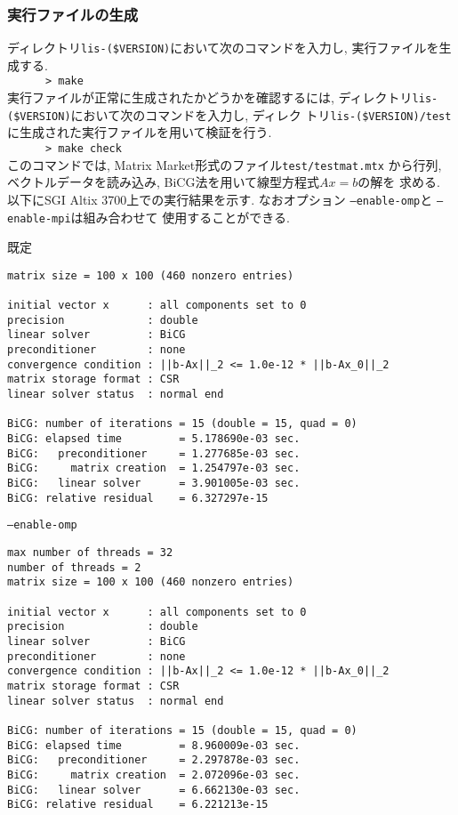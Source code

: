 \documentclass[a4paper]{jarticle}
\begin{document}
\subsubsection{実行ファイルの生成}
ディレクトリ{\tt lis-(\$VERSION)}において次のコマンドを入力し, 実行ファイルを生成する.\\
 \verb+      > make +\\
実行ファイルが正常に生成されたかどうかを確認するには, 
ディレクトリ{\tt lis-(\$VERSION)}において次のコマンドを入力し, ディレク
 トリ{\tt lis-(\$VERSION)/test}に生成された実行ファイルを用いて検証を行う. \\
 \verb+      > make check+\\
このコマンドでは, Matrix Market形式のファイル{\tt test/testmat.mtx}
から行列, ベクトルデータを読み込み, BiCG法を用いて線型方程式$Ax=b$の解を
求める. 以下にSGI Altix 3700上での実行結果を示す. 
なおオプション {\tt --enable-omp}と {\tt --enable-mpi}は組み合わせて
使用することができる. 
\begin{itembox}[l]{既定}
\begin{minipage}{10cm}
\begin{verbatim}
matrix size = 100 x 100 (460 nonzero entries)

initial vector x      : all components set to 0
precision             : double
linear solver         : BiCG
preconditioner        : none
convergence condition : ||b-Ax||_2 <= 1.0e-12 * ||b-Ax_0||_2
matrix storage format : CSR
linear solver status  : normal end

BiCG: number of iterations = 15 (double = 15, quad = 0)
BiCG: elapsed time         = 5.178690e-03 sec.
BiCG:   preconditioner     = 1.277685e-03 sec.
BiCG:     matrix creation  = 1.254797e-03 sec.
BiCG:   linear solver      = 3.901005e-03 sec.
BiCG: relative residual    = 6.327297e-15
\end{verbatim}
\end{minipage}
\end{itembox}
\begin{itembox}[l]{ {\tt --enable-omp}}
 \begin{minipage}{10cm}
 \begin{verbatim}
max number of threads = 32
number of threads = 2
matrix size = 100 x 100 (460 nonzero entries)

initial vector x      : all components set to 0
precision             : double
linear solver         : BiCG
preconditioner        : none
convergence condition : ||b-Ax||_2 <= 1.0e-12 * ||b-Ax_0||_2
matrix storage format : CSR
linear solver status  : normal end

BiCG: number of iterations = 15 (double = 15, quad = 0)
BiCG: elapsed time         = 8.960009e-03 sec.
BiCG:   preconditioner     = 2.297878e-03 sec.
BiCG:     matrix creation  = 2.072096e-03 sec.
BiCG:   linear solver      = 6.662130e-03 sec.
BiCG: relative residual    = 6.221213e-15
\end{verbatim}
\end{minipage}
\end{itembox}
\end{document}
